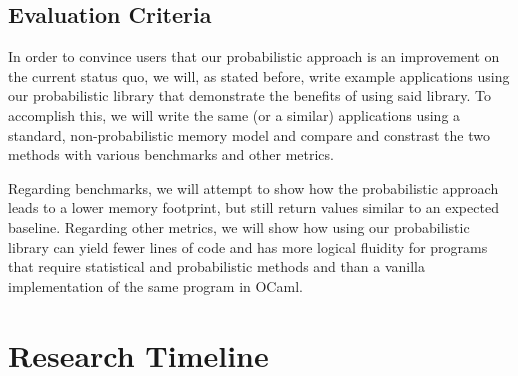 \documentclass{sig-alternate}
\begin{document}

\subsection{Evaluation Criteria}
\label{subsec:eval_criteria}
In order to convince users that our probabilistic approach is an improvement on the
current status quo, we will, as stated before, write example applications using our 
probabilistic library that demonstrate the benefits of using said library. To accomplish 
this, we will write the same (or a similar) applications using a standard, non-probabilistic memory model
and compare and constrast the two methods with various benchmarks and other metrics.

Regarding benchmarks, we will attempt to show how the probabilistic approach leads to 
a lower memory footprint, but still return values similar to an expected baseline. 
Regarding other metrics, we will show how using our probabilistic library can yield 
fewer lines of code and has more logical fluidity for programs that require statistical 
and probabilistic methods and than a vanilla implementation of the same program in OCaml. 

%

\section{Research Timeline}
\label{sec:research_timeline}
\end{document}
